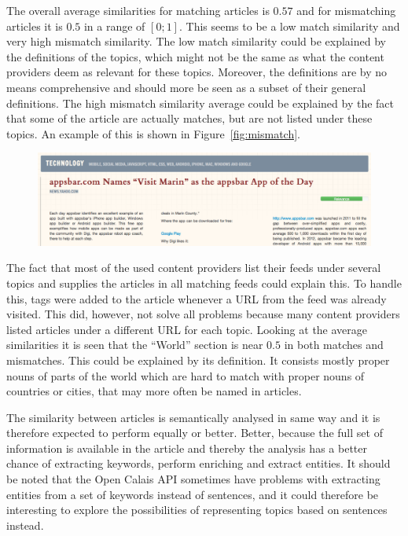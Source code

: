 The overall average similarities for matching articles is $0.57$ and for mismatching articles it is $0.5$ in a range of $[0;1]$. This seems to be a low match similarity and very high mismatch similarity. The low match similarity could be explained by the definitions of the topics, which might not be the same as what the content providers deem as relevant for these topics. Moreover, the definitions are by no means comprehensive and should more be seen as a subset of their general definitions. The high mismatch similarity average could be explained by the fact that some of the article are actually matches, but are not listed under these topics. An example of this is shown in Figure~\ref{fig:mismatch}.
\begin{figure}[h!tp]
	\myfloatalign
		\includegraphics[width=\textwidth]{img/mis-match}
\end{figure}
The fact that most of the used content providers list their feeds under several topics and supplies the articles in all matching feeds could explain this. To handle this, tags were added to the article whenever a URL from the feed was already visited. This did, however, not solve all problems because many content providers listed articles under a different URL for each topic. Looking at the average similarities it is seen that the ``World'' section is near $0.5$ in both matches and mismatches. This could be explained by its definition. It consists mostly proper nouns of parts of the world which are hard to match with proper nouns of countries or cities, that may more often be named in articles.

The similarity between articles is semantically analysed in same way and it is therefore expected to perform equally or better. Better, because the full set of information is available in the article and thereby the analysis has a better chance of extracting keywords, perform enriching and extract entities. It should be noted that the Open Calais API sometimes have problems with extracting entities from a set of keywords instead of sentences, and it could therefore be interesting to explore the possibilities of representing topics based on sentences instead.

